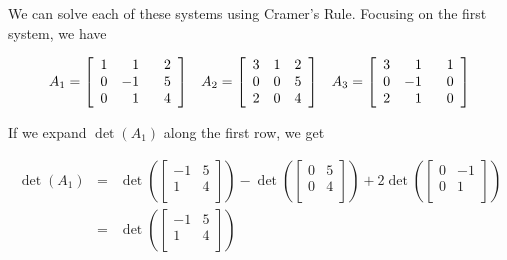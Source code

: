 \documentclass{ximera}
\begin{document}
We can solve each of these systems using Cramer's Rule.  Focusing on the first system, we have 

\[ \begin{array}{ccc}

A_{1} = \left[ \begin{array}{rrr} 1 & 1 & \hphantom{-}2 \\ 0 & -1 & 5 \\ 0 & 1 & 4 \\ \end{array} \right]

&

A_2 = \left[ \begin{array}{rrr} 3 &  1 & 2 \\ 0 & 0 & 5 \\ 2 & 0 & 4 \\ \end{array} \right]

&

A_3 = \left[ \begin{array}{rrr} 3 &  1 & \hphantom{-}1 \\ 0 & -1 & 0 \\ 2 & 1 & 0 \\ \end{array} \right]

\end{array} \]

If we expand $\det\left(A_{1}\right)$ along the first row, we get

\[ \begin{array}{rcl}

 \det\left(A_{1}\right) & = &  \det\left( \left[ \begin{array}{rr} -1 & 5 \\ 1 & 4 \\ \end{array} \right] \right) - \det\left( \left[ \begin{array}{rr} 0 & 5 \\ 0 & 4 \\ \end{array} \right] \right) + 2 \det\left( \left[ \begin{array}{rr} 0 & -1 \\ 0 & 1 \\ \end{array} \right] \right) \\  
                        
                      & = & \det\left( \left[ \begin{array}{rr} -1 & 5 \\ 1 & 4 \\ \end{array} \right] \right)
                        
\end{array} \]
\end{document}
